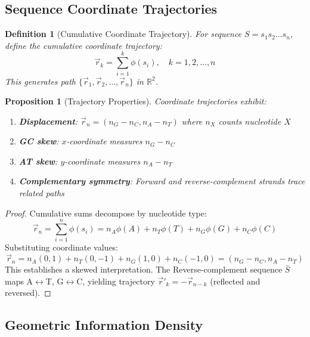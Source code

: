 \documentclass[11pt,a4paper]{article}
\newtheorem{definition}[theorem]{Definition}
\newtheorem{proposition}[theorem]{Proposition}
\theoremstyle{remark}
\begin{document}
\subsection{Sequence Coordinate Trajectories}

\begin{definition}[Cumulative Coordinate Trajectory]
\label{def:cumulative_trajectory}
For sequence $S = s_1 s_2 \ldots s_n$, define the cumulative coordinate trajectory:
\begin{equation}
\vec{r}_k = \sum_{i=1}^k \phi(s_i), \quad k = 1, 2, \ldots, n
\end{equation}
This generates path $\{\vec{r}_1, \vec{r}_2, \ldots, \vec{r}_n\}$ in $\mathbb{R}^2$.
\end{definition}

\begin{proposition}[Trajectory Properties]
\label{prop:trajectory_properties}
Coordinate trajectories exhibit:
\begin{enumerate}
\item \textbf{Displacement}: $\vec{r}_n = (n_G - n_C, n_A - n_T)$ where $n_X$ counts nucleotide $X$
\item \textbf{GC skew}: $x$-coordinate measures $n_G - n_C$
\item \textbf{AT skew}: $y$-coordinate measures $n_A - n_T$
\item \textbf{Complementary symmetry}: Forward and reverse-complement strands trace related paths
\end{enumerate}
\end{proposition}

\begin{proof}
Cumulative sums decompose by nucleotide type:
\begin{equation}
\vec{r}_n = \sum_{i=1}^n \phi(s_i) = n_A\phi(A) + n_T\phi(T) + n_G\phi(G) + n_C\phi(C)
\end{equation}
Substituting coordinate values:
\begin{equation}
\vec{r}_n = n_A(0,1) + n_T(0,-1) + n_G(1,0) + n_C(-1,0) = (n_G - n_C, n_A - n_T)
\end{equation}
This establishes a skewed interpretation. The Reverse-complement sequence $\bar{S}$ maps A$\leftrightarrow$T, G$\leftrightarrow$C, yielding trajectory $\vec{r}'_k = -\vec{r}_{n-k}$ (reflected and reversed).
\end{proof}

\subsection{Geometric Information Density}
\end{document}

